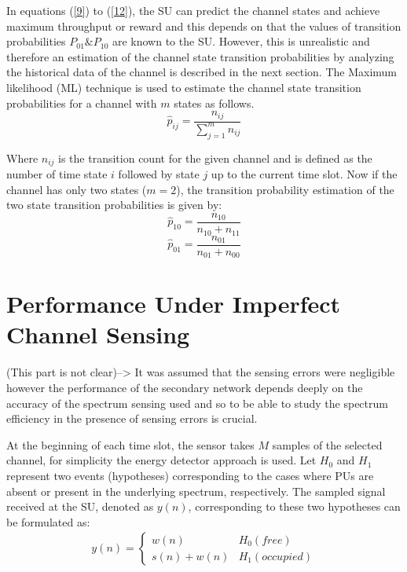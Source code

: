 \documentclass[twocolumn]{el-author}
\begin{document}
In equations (\ref{9}) to (\ref{12}), the SU can predict the channel states and achieve maximum throughput or reward and this depends on that the values of transition probabilities $P_{01} \& P_{10}$ are known to the SU. However, this is unrealistic and therefore an estimation of the channel state transition probabilities by analyzing the historical data of the channel is described in the next section. The Maximum likelihood (ML)  technique \cite{Teodorescu2009,Craig1998} is used to estimate the channel state transition probabilities for a channel with $m$ states as follows.  
\begin{equation}\label{23}
{\hat{p}}_{ij}=\frac{n_{ij}}{\sum^m_{j=1}{n_{ij}}}
\end{equation}


Where ${n}_{ij}$ is the transition count for the given channel and  is defined as the number of time state $i$ followed by state $j$ up to the current time slot. Now if the channel has only two states ($m=2$), the transition probability estimation of the two state transition probabilities is given by:
\begin{equation}\label{24}
{\hat{p}}_{10}=\frac{n_{10}}{n_{10}+n_{11}}
\end{equation}
\begin{equation}\label{25}
{\hat{p}}_{01}=\frac{n_{01}}{n_{01}+n_{00}}
\end{equation}
%	
\section{Performance Under Imperfect Channel Sensing}
(This part is not clear)--> It was assumed that the sensing errors were negligible however the performance of the secondary network depends deeply on the accuracy of the spectrum sensing used \cite{Yucek:2009:SSS:2211326.2211414} and so to be able to study the spectrum efficiency in the presence of sensing errors is crucial. 


At the beginning of each time slot, the sensor takes $M$ samples of the selected channel, for simplicity the energy detector approach is used. Let $ H_0 $ and $H_1$ represent two events (hypotheses) corresponding to the cases where PUs are absent or present in the underlying spectrum, respectively. The sampled signal received at the SU, denoted as $y(n)$, corresponding to these two hypotheses can be formulated as:
\begin{align}\label{kondolies1}
y(n)=\left\{\begin{matrix}
w(n) & H_0(free)\\ 
s(n)+w(n) & H_1 (occupied)
\end{matrix}\right.
\end{align}
\end{document}
